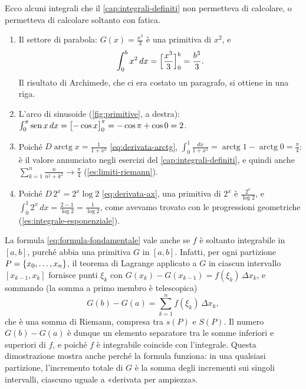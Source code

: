 \begin{esempio}
\label{es:formula-fondamentale}
Ecco alcuni integrali che il \cref{cap:integrali-definiti} non permetteva di calcolare, o
permetteva di calcolare soltanto con fatica.
\begin{enumerate}[label=\textup{(\alph*)}]
  \item Il settore di parabola: $G(x)=\frac{x^{3}}3$ è una primitiva di $x^{2}$, e
  \[
    \int_{0}^{b}x^{2}\,dx=\Bigl[\frac{x^{3}}3\Bigr]_{0}^{b}=\frac{b^{3}}3 .
  \]
  Il risultato di Archimede,
  che ci era costato un paragrafo, si ottiene in una riga.
  \item L'arco di sinusoide (\cref{fig:primitive}, a destra):
  $\int_{0}^{\pi}\operatorname{sen} x\,dx=\bigl[-\cos x\bigr]_{0}^{\pi}=-\cos\pi+\cos0=2$.
  \item Poiché $D\operatorname{arctg}x=\frac1{1+x^{2}}$ \eqref{eq:derivata-arctg},
  $\int_{0}^{1}\frac{dx}{1+x^{2}}=\operatorname{arctg}1-\operatorname{arctg}0=\frac\pi4$: è il
  valore annunciato negli esercizi del \cref{cap:integrali-definiti}, e quindi anche
  $\sum_{k=1}^{n}\frac n{n^{2}+k^{2}}\to\frac\pi4$ (\cref{es:limiti-riemann}).
  \item Poiché $D\,2^{x}=2^{x}\log2$ \eqref{eq:derivata-ax}, una primitiva di $2^{x}$ è
  $\frac{2^{x}}{\log2}$, e $\int_{0}^{1}2^{x}\,dx=\frac{2-1}{\log2}=\frac1{\log2}$, come avevamo
  trovato con le progressioni geometriche (\cref{es:integrale-esponenziale}).
\end{enumerate}
\end{esempio}

\begin{osservazione}
\label{oss:formula-fondamentale-integrabili}
La formula \eqref{eq:formula-fondamentale} vale anche se $f$ è soltanto integrabile in
$[a,b]$, purché abbia una primitiva $G$ in $[a,b]$. Infatti, per ogni partizione
$P=\left\{ x_{0},\dots,x_{n} \right\}$, il teorema di Lagrange applicato a $G$ in ciascun intervallo
$[x_{k-1},x_{k}]$ fornisce punti $\xi_{k}$ con $G(x_{k})-G(x_{k-1})=f(\xi_{k})\,\Delta x_{k}$, e
sommando (la somma a primo membro è telescopica)
\[
  G(b)-G(a)=\sum_{k=1}^{n}f(\xi_{k})\,\Delta x_{k} ,
\]
che è una somma di Riemann, compresa tra $s(P)$ e $S(P)$. Il numero $G(b)-G(a)$ è dunque un
elemento separatore tra le somme inferiori e superiori di $f$, e poiché $f$ è
integrabile coincide con l'integrale. Questa dimostrazione mostra anche perché la
formula funziona: in una qualsiasi partizione, l'incremento totale di $G$ è la somma
degli incrementi sui singoli intervalli, ciascuno uguale a «derivata per ampiezza».
\end{osservazione}

